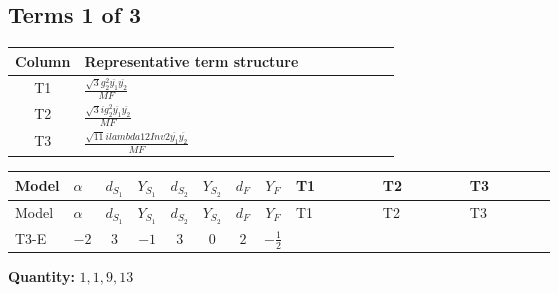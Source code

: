 \documentclass[8pt]{article}
\begin{document}
\begin{landscape}
\subsection*{Terms 1 of 3}
\begin{center}
\begin{tabular}{@{}c >{\raggedright\arraybackslash}p{0.82\linewidth}@{}}
\toprule
Column & Representative term structure \\
\midrule
T1 & \(\displaystyle \frac{\sqrt{3} g_{2}^{2} \overline{y_{1}} \overline{y_{2}}}{MF}\) \\
\midrule
T2 & \(\displaystyle \frac{\sqrt{3} i g_{2}^{2} \overline{y_{1}} \overline{y_{2}}}{MF}\) \\
\midrule
T3 & \(\displaystyle \frac{\sqrt{11} i lambda12Inv2 \overline{y_{1}} \overline{y_{2}}}{MF}\) \\
\midrule
\bottomrule
\end{tabular}
\end{center}
\smallskip
\tiny
\begin{longtable}{@{}llcccccc >{\raggedright\arraybackslash}p{0.21\linewidth} >{\raggedright\arraybackslash}p{0.21\linewidth} >{\raggedright\arraybackslash}p{0.21\linewidth}@{}}
\toprule
Model & $\alpha$ & $d_{S_1}$ & $Y_{S_1}$ & $d_{S_2}$ & $Y_{S_2}$ & $d_F$ & $Y_F$ & T1 & T2 & T3 \\
\midrule
\endfirsthead
\toprule
Model & $\alpha$ & $d_{S_1}$ & $Y_{S_1}$ & $d_{S_2}$ & $Y_{S_2}$ & $d_F$ & $Y_F$ & T1 & T2 & T3 \\
\midrule
\endhead
T3-E & $-2$ & $3$ & $-1$ & $3$ & $0$ & $2$ & $-\frac{1}{2}$ & \scriptsize\adjustbox{max width=\linewidth}{$\begin{gathered} - \frac{\sqrt{3} g_{2}^{2} \overline{y_{1}} \overline{y_{2}}}{6 MF}\end{gathered}$} & \scriptsize\adjustbox{max width=\linewidth}{$\begin{gathered} - \frac{49 \sqrt{3} i g_{2}^{2} \overline{y_{1}} \overline{y_{2}}}{24 MF}\end{gathered}$} & \scriptsize\adjustbox{max width=\linewidth}{$\begin{gathered} - \frac{3 \sqrt{11} i lambda12Inv2 \overline{y_{1}} \overline{y_{2}}}{22 MF}\end{gathered}$} \\
\midrule
\bottomrule
\end{longtable}
\clearpage
\noindent\textbf{Quantity: }$\mathrm{1,1,9,13}$\par\smallskip

\end{landscape}
\end{document}
